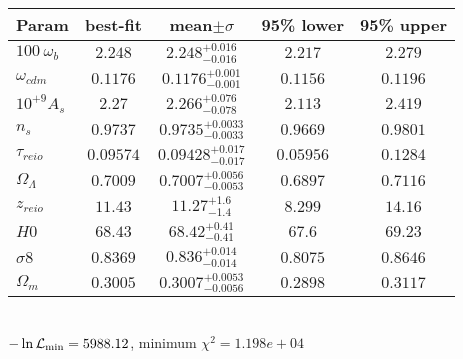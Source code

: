 \begin{tabular}{|l|c|c|c|c|} 
 \hline 
Param & best-fit & mean$\pm\sigma$ & 95\% lower & 95\% upper \\ \hline 
$100~\omega_{b }$ &$2.248$ & $2.248_{-0.016}^{+0.016}$ & $2.217$ & $2.279$ \\ 
$\omega_{cdm }$ &$0.1176$ & $0.1176_{-0.001}^{+0.001}$ & $0.1156$ & $0.1196$ \\ 
$10^{+9}A_{s }$ &$2.27$ & $2.266_{-0.078}^{+0.076}$ & $2.113$ & $2.419$ \\ 
$n_{s }$ &$0.9737$ & $0.9735_{-0.0033}^{+0.0033}$ & $0.9669$ & $0.9801$ \\ 
$\tau_{reio }$ &$0.09574$ & $0.09428_{-0.017}^{+0.017}$ & $0.05956$ & $0.1284$ \\ 
$\Omega_{\Lambda }$ &$0.7009$ & $0.7007_{-0.0053}^{+0.0056}$ & $0.6897$ & $0.7116$ \\ 
$z_{reio }$ &$11.43$ & $11.27_{-1.4}^{+1.6}$ & $8.299$ & $14.16$ \\ 
$H0$ &$68.43$ & $68.42_{-0.41}^{+0.41}$ & $67.6$ & $69.23$ \\ 
$\sigma8$ &$0.8369$ & $0.836_{-0.014}^{+0.014}$ & $0.8075$ & $0.8646$ \\ 
$\Omega_{m }$ &$0.3005$ & $0.3007_{-0.0056}^{+0.0053}$ & $0.2898$ & $0.3117$ \\ 
\hline 
 \end{tabular} \\ 
$-\ln{\cal L}_\mathrm{min} =5988.12$, minimum $\chi^2=1.198e+04$ \\ 
